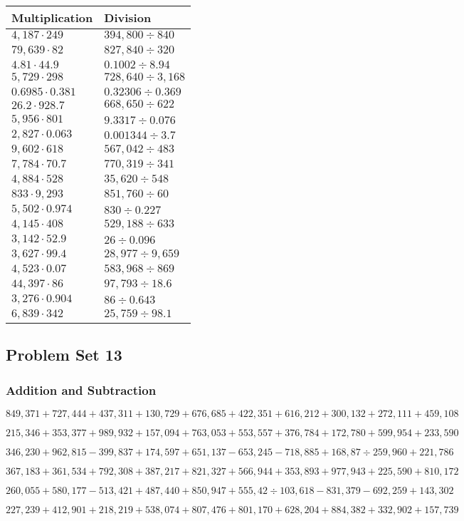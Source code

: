 \begin{longtable}[]{@{}ll@{}}
\toprule
Multiplication & Division\tabularnewline
\midrule
\endhead
\(4,187\cdot249\) & \(394,800÷840\)\tabularnewline
\(79,639\cdot82\) & \(827,840÷320\)\tabularnewline
\(4.81\cdot44.9\) & \(0.1002÷8.94\)\tabularnewline
\(5,729\cdot298\) & \(728,640÷3,168\)\tabularnewline
\(0.6985\cdot0.381\) & \(0.32306÷0.369\)\tabularnewline
\(26.2\cdot928.7\) & \(668,650÷622\)\tabularnewline
\(5,956\cdot801\) & \(9.3317÷0.076\)\tabularnewline
\(2,827\cdot0.063\) & \(0.001344÷3.7\)\tabularnewline
\(9,602\cdot618\) & \(567,042÷483\)\tabularnewline
\(7,784\cdot70.7\) & \(770,319÷341\)\tabularnewline
\(4,884\cdot528\) & \(35,620÷548\)\tabularnewline
\(833\cdot9,293\) & \(851,760÷60\)\tabularnewline
\(5,502\cdot0.974\) & \(830÷0.227\)\tabularnewline
\(4,145\cdot408\) & \(529,188÷633\)\tabularnewline
\(3,142\cdot52.9\) & \(26÷0.096\)\tabularnewline
\(3,627\cdot99.4\) & \(28,977÷9,659\)\tabularnewline
\(4,523\cdot0.07\) & \(583,968÷869\)\tabularnewline
\(44,397\cdot86\) & \(97,793÷18.6\)\tabularnewline
\(3,276\cdot0.904\) & \(86÷0.643\)\tabularnewline
\(6,839\cdot342\) & \(25,759÷98.1\)\tabularnewline
\bottomrule
\end{longtable}

\hypertarget{problem-set-13-5}{%
\subsection{Problem Set 13}\label{problem-set-13-5}}

\hypertarget{addition-and-subtraction-318}{%
\subsubsection{Addition and
Subtraction}\label{addition-and-subtraction-318}}

\(849,371+727,444+437,311+130,729+676,685+422,351+616,212+300,132+272,111+ 459,108\)

\(215,346+353,377+989,932+157,094+763,053+553,557+376,784+172,780+599,954+233,590\)

\(346,230+962,815-399,837+174,597+651,137-653,245-718,885+168,87÷259,960+221,786\)

\(367,183+361,534+792,308+387,217+821,327+566,944+353,893+977,943+225,590+810,172\)

\(260,055+580,177-513,421+487,440+850,947+555,42÷103,618-831,379-692,259+143,302\)

\(227,239+412,901+218,219+538,074+807,476+801,170+628,204+884,382+332,902+157,739\)

